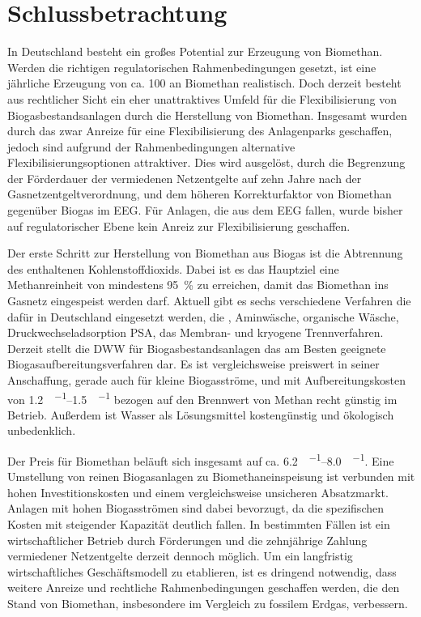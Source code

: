 
\section{Schlussbetrachtung}\label{ch_sum}

In Deutschland besteht ein großes Potential zur Erzeugung von Biomethan. Werden die richtigen regulatorischen Rahmenbedingungen gesetzt, ist eine jährliche Erzeugung von ca. \SI{100}{\twh} an Biomethan realistisch. Doch derzeit besteht aus rechtlicher Sicht ein eher unattraktives Umfeld für die Flexibilisierung von Biogasbestandsanlagen durch die Herstellung von Biomethan. Insgesamt wurden durch das  zwar Anreize für eine Flexibilisierung des Anlagenparks geschaffen, jedoch sind aufgrund der Rahmenbedingungen alternative Flexibilisierungsoptionen attraktiver. Dies wird ausgelöst, durch die Begrenzung der Förderdauer der vermiedenen Netzentgelte auf zehn Jahre nach der Gasnetzentgeltverordnung, und dem höheren Korrekturfaktor von Biomethan gegenüber Biogas im \gls{EEG}. Für Anlagen, die aus dem \gls{EEG} fallen, wurde bisher auf regulatorischer Ebene kein Anreiz zur Flexibilisierung geschaffen.\smallskip

Der erste Schritt zur Herstellung von Biomethan aus Biogas ist die Abtrennung des enthaltenen Kohlenstoffdioxids. Dabei ist es das Hauptziel eine Methanreinheit von mindestens \SI{95}{\percent} zu erreichen, damit das Biomethan ins Gasnetz eingespeist werden darf. Aktuell gibt es sechs verschiedene Verfahren die dafür in Deutschland eingesetzt werden, die , Aminwäsche, organische Wäsche, Druckwechseladsorption \gls{PSA}, das Membran- und kryogene Trennverfahren. Derzeit stellt die \gls{DWW} für Biogasbestandsanlagen das am Besten geeignete Biogasaufbereitungsverfahren dar. Es ist vergleichsweise preiswert in seiner Anschaffung, gerade auch für kleine Biogasströme, und mit Aufbereitungskosten von \SIrange{1,2}{1,5}{\ct\per\kwh} bezogen auf den Brennwert von Methan recht günstig im Betrieb. Außerdem ist Wasser als Lösungsmittel kostengünstig und ökologisch unbedenklich.\smallskip

Der Preis für Biomethan beläuft sich insgesamt auf ca. \SIrange{6,2}{8,0}{\ct\per\kwh}. Eine Umstellung von reinen Biogasanlagen zu Biomethaneinspeisung ist verbunden mit hohen Investitionskosten und einem vergleichsweise unsicheren Absatzmarkt. Anlagen mit hohen Biogasströmen sind dabei bevorzugt, da die spezifischen Kosten mit steigender Kapazität deutlich fallen. In bestimmten Fällen ist ein wirtschaftlicher Betrieb durch Förderungen und die zehnjährige Zahlung vermiedener Netzentgelte derzeit dennoch möglich. Um ein langfristig wirtschaftliches Geschäftsmodell zu etablieren, ist es dringend notwendig, dass weitere Anreize und rechtliche Rahmenbedingungen geschaffen werden, die den Stand von Biomethan, insbesondere im Vergleich zu fossilem Erdgas, verbessern. \smallskip

